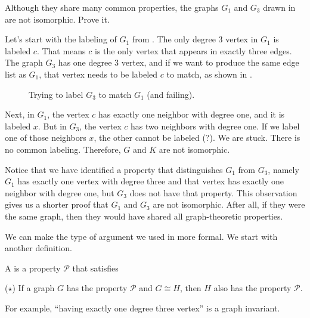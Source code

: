 \begin{exam}
\label{exam_not_ism}
    Although they share many common properties, the graphs $G_1$ and $G_3$ drawn in  are not isomorphic. Prove it.
        \begin{soln}
            Let's start with the labeling of $G_1$ from .  The only degree 3 vertex in $G_1$ is labeled $c$.  That means $c$ is the only vertex that appears in exactly three edges.  The graph $G_3$ has one degree 3 vertex, and if we want to produce the same edge list as $G_1$, that vertex needs to be labeled $c$ to match, as shown in .  
            
        \begin{figure}[hbtp]
            \centering
            
            \caption{Trying to label $G_3$ to match $G_1$ (and failing).}
            \label{fig_failed_labeling}
        \end{figure}             
            Next, in $G_1$, the vertex $c$ has exactly one neighbor with degree one, and it is labeled $x$.
            But in $G_3$, the vertex $c$ has two neighbors with degree one.  If we label one of those neighbors $x$, the other cannot be labeled (?). We are stuck.  There is no common labeling.  Therefore, $G$ and $K$ are not isomorphic.

            Notice that we have identified a property that distinguishes $G_1$ from $G_3$, namely $G_1$ has exactly one vertex with degree three and that vertex has exactly one neighbor with degree one, but $G_3$ does not have that property. This observation gives us a shorter proof that $G_1$ and $G_3$ are not isomorphic. After all, if they were the same graph, then they would have shared all graph-theoretic properties.
        \end{soln}
\end{exam} 

We can make the type of argument we used in  more formal.  We start with another definition.

\begin{defn}
\label{defn_graph_invariant}
    A  is a property $\mathcal{P}$ that satisfies 
        \begin{center} 
            ($\star$) If a graph $G$ has the property $\mathcal{P}$ and $G \cong H$, then $H$ also has the property $\mathcal{P}$.  
        \end{center}
    For example, ``having exactly one degree three vertex'' is a graph invariant. 
\end{defn}

